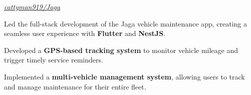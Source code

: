 \documentclass[../main.tex]{subfiles}
\begin{document}
\vspace{0.2 cm}

\begin{twocolentry}{
    \small
    \textit{\href{https://github.com/cattyman919/Jaga}{cattyman919/Jaga}}
}
\end{twocolentry}

\vspace{0.10 cm}
\begin{onecolentry}
\begin{highlights}
    \item Led the full-stack development of the Jaga vehicle maintenance app, creating a seamless user experience with \textbf{Flutter} and \textbf{NestJS}.
    \item Developed a \textbf{GPS-based tracking system} to monitor vehicle mileage and trigger timely service reminders.
    \item Implemented a \textbf{multi-vehicle management system}, allowing users to track and manage maintenance for their entire fleet.
\end{highlights}
\end{onecolentry}
\end{document}
